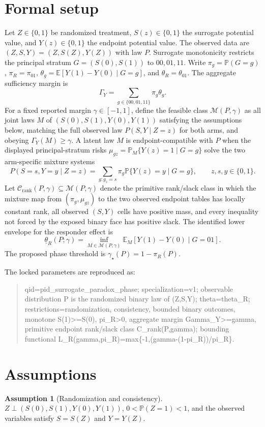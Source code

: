 \documentclass[11pt]{article}
\newcommand{\E}{\mathbb{E}}
\renewcommand{\Pr}{\mathbb{P}}
\theoremstyle{definition}
\newtheorem{assumption}{Assumption}
\theoremstyle{plain}
\theoremstyle{remark}
\begin{document}
\section{Formal setup}
Let \(Z\in\{0,1\}\) be randomized treatment, \(S(z)\in\{0,1\}\) the surrogate potential value, and \(Y(z)\in\{0,1\}\) the endpoint potential value.  The observed data are \((Z,S,Y)=(Z,S(Z),Y(Z))\) with law \(P\).  Surrogate monotonicity restricts the principal stratum \(G=(S(0),S(1))\) to \(00,01,11\).  Write \(\pi_g=\Pr(G=g)\), \(\pi_R=\pi_{01}\), \(\theta_g=\E[Y(1)-Y(0)\mid G=g]\), and \(\theta_R=\theta_{01}\).  The aggregate sufficiency margin is
\[
  \Gamma_Y = \sum_{g\in\{00,01,11\}} \pi_g\theta_g.
\]
For a fixed reported margin \(\gamma\in[-1,1]\), define the feasible class \(\mathcal M(P,\gamma)\) as all joint laws \(M\) of \((S(0),S(1),Y(0),Y(1))\) satisfying the assumptions below, matching the full observed law \(P(S,Y\mid Z=z)\) for both arms, and obeying \(\Gamma_Y(M)\ge\gamma\).  A latent law \(M\) is endpoint-compatible with \(P\) when the displayed principal-stratum risks \(\mu_{gz}=\Pr_M\{Y(z)=1\mid G=g\}\) solve the two arm-specific mixture systems
\[
  P(S=s,Y=y\mid Z=z)=
  \sum_{g:g_z=s}\pi_g \Pr\{Y(z)=y\mid G=g\},
  \qquad z,s,y\in\{0,1\}.
\]
Let \(\mathcal C_{\mathrm{rank}}(P,\gamma)\subseteq\mathcal M(P,\gamma)\) denote the primitive rank/slack class in which the mixture map from \((\pi_g,\mu_{gz})\) to the two observed endpoint tables has locally constant rank, all observed \((S,Y)\) cells have positive mass, and every inequality not forced by the exposed binary face has positive slack.  The identified lower envelope for the responder effect is
\[
  \underline\theta_R(P;\gamma)=\inf_{M\in\mathcal M(P,\gamma)} \E_M[Y(1)-Y(0)\mid G=01].
\]
The proposed phase threshold is \(\gamma_\star(P)=1-\pi_R(P)\).

The locked parameters are reproduced as:
\begin{quote}\small\ttfamily
qid=pid\_surrogate\_paradox\_phase; specialization=v1; observable distribution P is the randomized binary law of (Z,S,Y); theta=theta\_R; restrictions=randomization, consistency, bounded binary outcomes, monotone S(1)>=S(0), pi\_R>0, aggregate margin Gamma\_Y>=gamma, primitive endpoint rank/slack class C\_rank(P,gamma); bounding functional L\_R(gamma,pi\_R)=max\{-1,(gamma-(1-pi\_R))/pi\_R\}.
\end{quote}

\section{Assumptions}
\begin{assumption}[Randomization and consistency]\label{ass:rand-cons}
\(Z\perp (S(0),S(1),Y(0),Y(1))\), \(0<\Pr(Z=1)<1\), and the observed variables satisfy \(S=S(Z)\) and \(Y=Y(Z)\).
\end{assumption}
\end{document}
